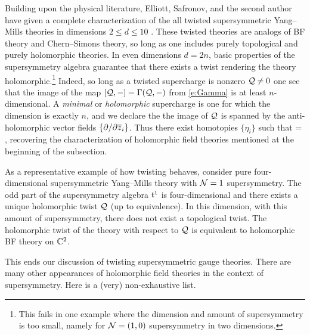 \documentclass[11pt]{amsart}
\def\del{\partial}
\begin{document}
Building upon the physical literature, Elliott, Safronov, and the second author have given a complete characterization of the all twisted supersymmetric Yang--Mills theories in dimensions $2 \leq d \leq 10$ \autocite{ESW}. 
These twisted theories are analogs of BF theory and Chern--Simons theory, so long as one includes purely topological and purely holomorphic theories.
In even dimensions $d = 2n$, basic properties of the supersymmetry algebra guarantee that there exists a twist rendering the theory holomorphic.\footnote{This fails in one example where the dimension and amount of supersymmetry is too small, namely for $\mathcal N=(1,0)$ supersymmetry in two dimensions.}
Indeed, so long as a twisted supercharge is nonzero $\mathcal Q \ne 0$ one see that the image of the map $[\mathcal Q,-] = \Gamma(\mathcal Q,-)$ from \eqref{e:Gamma} is at least $n$-dimensional.
A {\em minimal} or {\em holomorphic} supercharge is one for which the dimension is exactly $n$, 
and we declare the the image of $\mathcal Q$ is spanned by the anti-holomorphic vector fields $\{\del / \del \zbar_i\}$.
Thus there exist homotopies $\{\eta_i\}$ such that 
\beqn
[\cQ,\eta_i] = \frac{\del}{\del \zbar_i} ,
\eeqn 
recovering the characterization of holomorphic field theories mentioned at the beginning of the subsection. 


As a representative example of how twisting behaves, 
consider pure four-dimensional supersymmetric Yang--Mills theory with $\mathcal N=1$ supersymmetry.
The odd part of the supersymmetry algebra $\mathfrak t^1$ is four-dimensional and there exists a unique holomorphic twist $\mathcal Q$ (up to equivalence).
In this dimension, with this amount of supersymmetry, there does not exist a topological twist.
The holomorphic twist of the theory with respect to $\mathcal Q$ is equivalent to holomorphic BF theory on $\mathbb C^2$.

This ends our discussion of twisting supersymmetric gauge theories.
There are many other appearances of holomorphic field theories in the context of supersymmetry.
Here is a (very) non-exhaustive list.
\end{document}
